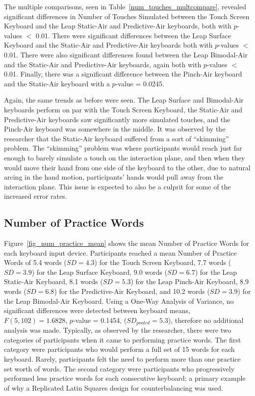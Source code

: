 The multiple comparisons, seen in Table~\ref{num_touches_multcompare}, revealed significant differences in Number of Touches Simulated between the Touch Screen Keyboard and the Leap Static-Air and Predictive-Air keyboards, both with $p$-values $<$ 0.01. There were significant differences between the Leap Surface Keyboard and the Static-Air and Predictive-Air keyboards both with $p$-values $<$ 0.01. There were also significant differences found between the Leap Bimodal-Air and the Static-Air and Predictive-Air keyboards, again both with $p$-values $<$ 0.01. Finally, there was a significant difference between the Pinch-Air keyboard and the Static-Air keyboard with a $p$-value = 0.0245.

Again, the same trends as before were seen. The Leap Surface and Bimodal-Air keyboards perform on par with the Touch Screen Keyboard, the Static-Air and Predictive-Air keyboards saw significantly more simulated touches, and the Pinch-Air keyboard was somewhere in the middle. It was observed by the researcher that the Static-Air keyboard suffered from a sort of ``skimming'' problem. The ``skimming'' problem was where participants would reach just far enough to barely simulate a touch on the interaction plane, and then when they would move their hand from one side of the keyboard to the other, due to natural arcing in the hand motion, participants' hands would pull away from the interaction plane. This issue is expected to also be a culprit for some of the increased error rates.

\subsection{Number of Practice Words}
Figure~\ref{fig_num_practice_mean} shows the mean Number of Practice Words for each keyboard input device. Participants reached a mean Number of Practice Words of 5.4 words ($SD = 4.3$) for the Touch Screen Keyboard, 7.7 words ($SD = 3.9$) for the Leap Surface Keyboard, 9.0 words ($SD = 6.7$) for the Leap Static-Air Keyboard, 8.1 words ($SD = 5.3$) for the Leap Pinch-Air Keyboard, 8.9 words ($SD = 6.8$) for the Predictive-Air Keyboard, and 10.2 words ($SD = 3.9$) for the Leap Bimodal-Air Keyboard. Using a One-Way Analysis of Variance, no significant differences were detected between keyboard means, $F(5, 102) = 1.6828$, $p$-value = 0.1454, ($SD_{pooled} = 5.3$), therefore no additional analysis was made. Typically, as observed by the researcher, there were two categories of participants when it came to performing practice words. The first category were participants who would perform a full set of 15 words for each keyboard. Rarely, participants felt the need to perform more than one practice set worth of words. The second category were participants who progressively performed less practice words for each consecutive keyboard; a primary example of why a Replicated Latin Squares design for counterbalancing was used.

